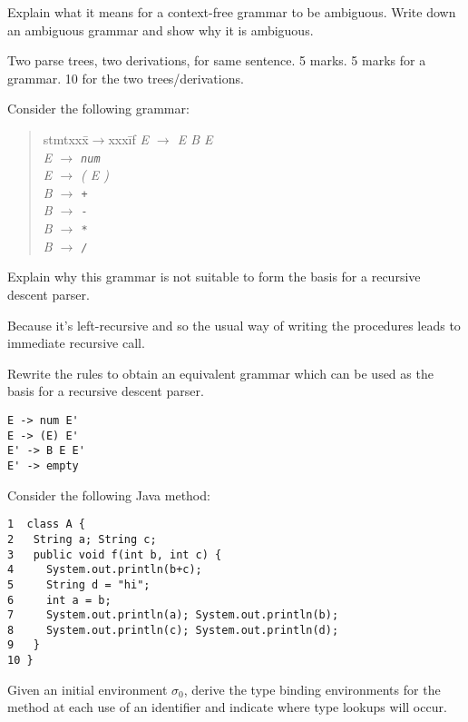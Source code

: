 \documentclass[11pt]{bareexam}
\begin{document}
\begin{questions}
\begin{subquestions}
\subquestion
Explain what it means for a context-free grammar to be ambiguous. 
Write down an ambiguous grammar and show why it is ambiguous.

\begin{modelanswer}
Two parse trees, two derivations, for same sentence. 5 marks.
5 marks for a grammar. 10 for the two trees/derivations.
\end{modelanswer}

\subquestion

Consider the following grammar:
\begin{quote}
\begin{tabbing}
stmtxxx\=$\rightarrow$xxx\=if\kill
\it
E \> $\rightarrow$ \> {\it E\/} {\it B\/} {\it E} \\
\it
E    \> $\rightarrow$ \> \verb!num! \\
\it
E    \> $\rightarrow$ \> ( {\it E\/} ) \\
\it
B     \> $\rightarrow$ \> \verb!+! \\
\it
B     \> $\rightarrow$ \> \verb!-! \\
\it
B     \> $\rightarrow$ \> \verb!*! \\
\it
B     \> $\rightarrow$ \> \verb!/! \\
\end{tabbing}
\end{quote}
\begin{subsubquestions}
\subsubquestion
Explain why this grammar is not suitable to form the basis for a 
recursive descent parser.

\begin{modelanswer}
Because it's left-recursive and so the usual way of writing the 
procedures leads to immediate recursive call.
\end{modelanswer}

\subsubquestion
Rewrite the rules to obtain an equivalent grammar which can
be used as the basis for a recursive descent parser.
\end{subsubquestions}

\begin{modelanswer}
\begin{verbatim}
E -> num E'
E -> (E) E'
E' -> B E E'
E' -> empty
\end{verbatim}
\end{modelanswer}

\subquestion
Consider the following Java method:
\begin{verbatim}
1  class A {
2   String a; String c;
3   public void f(int b, int c) {
4     System.out.println(b+c);
5     String d = "hi";
6     int a = b;
7     System.out.println(a); System.out.println(b);
8     System.out.println(c); System.out.println(d);
9   }
10 }
\end{verbatim}
Given an initial environment $\sigma_0$, 
derive the type binding environments for the method at each
use of an identifier and indicate where type lookups will occur.


\end{subquestions}
\end{questions}
\end{document}

